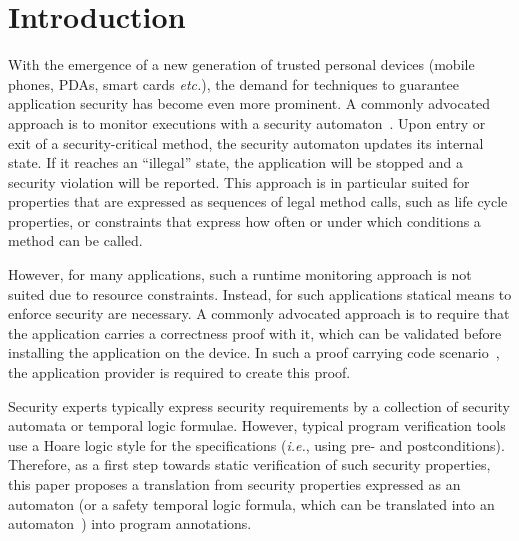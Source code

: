 \section{Introduction}\label{SecIntro}

With the emergence of a new generation of trusted personal devices
(mobile phones, PDAs, smart cards \emph{etc.}), the demand for
techniques to guarantee application security has become even more
prominent. A commonly advocated approach is to monitor
executions with a security automaton~\cite{Schneider99}. Upon entry
or exit of a security-critical method, the security automaton updates
its internal state. If it reaches an ``illegal'' state, the
application will be stopped and a security violation will be
reported. This approach is in particular suited for properties that
are expressed as sequences of legal method calls, such as life cycle
properties, or constraints that express how often or under which
conditions a method can be called.

However, for many applications, such a runtime monitoring approach is
not suited due to resource constraints.
Instead, for such applications
statical means to enforce security are necessary. A commonly advocated
approach is to require that the application carries a correctness
proof with it, which can be validated before installing the application
on the device. In such a proof carrying code scenario~\cite{Necula97},
the application provider is required to create this proof.

Security experts typically express security requirements by a collection of
security automata or temporal logic formulae. However, typical program
verification tools %
use a Hoare logic style for the specifications (\emph{i.e.}, using pre- and
postconditions). Therefore, as a first step towards static
verification of such security properties, this paper proposes a
translation from security properties expressed as an automaton (or a
safety temporal logic formula, which can be translated into an
automaton~\cite{Wolper01}) into program annotations.

